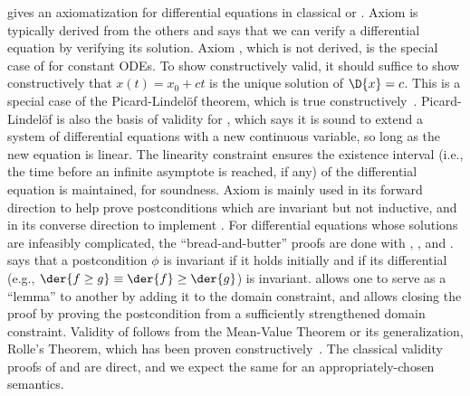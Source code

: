 \documentclass[12pt]{cmuthesis}
\theoremstyle{definition}
\theoremstyle{remark}
\newcommand{\rref}[2][]{\prettyref{#2}}
\begin{document}
\rref{fig:diffeq-rules} gives an axiomatization for differential equations in classical \dL or \dGL.
Axiom  is typically derived from the others and says that we can verify a differential equation by verifying its solution.
Axiom , which is not derived, is the special case of  for constant ODEs.
To show  constructively valid, it should suffice to show constructively that $x(t) = x_0 + ct$ is the unique solution of $\D{x}=c$.
This is a special case of the Picard-Lindel\"{o}f theorem, which is true constructively~\cite{DBLP:journals/corr/abs-11063-448,Krebbers+Spitters:lmcs:corn:2011}.
Picard-Lindel\"{o}f is also the basis of validity for , which says it is sound to extend a system of differential equations with a new continuous variable, so long as the new equation is linear.
The linearity constraint ensures the existence interval (i.e., the time before an infinite asymptote is reached, if any) of the differential equation is maintained, for soundness.
Axiom  is mainly used in its forward direction to help prove postconditions which are invariant but not inductive, and in its converse direction to implement .
For differential equations whose solutions are infeasibly complicated, the ``bread-and-butter'' proofs are done with , , and .
 says that a postcondition $\phi$ is invariant if it holds initially and if its differential (e.g., $\der{f\geq g} \equiv \der{f} \geq \der{g}$) is invariant.
 allows one  to serve as a ``lemma'' to another by adding it to the domain constraint, and  allows closing the proof by proving the postcondition from a sufficiently strengthened domain constraint.
Validity of  follows from the Mean-Value Theorem or its generalization, Rolle's Theorem, which has been proven constructively~\cite{DBLP:journals/corr/abs-11063-448,Krebbers+Spitters:lmcs:corn:2011}.
The classical validity proofs of  and  are direct, and we expect the same for an appropriately-chosen semantics.
\end{document}
